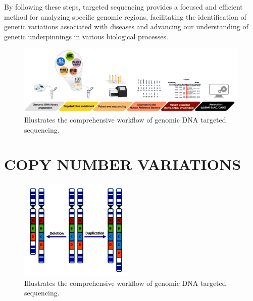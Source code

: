 \documentclass[a4paper,12pt,twoside]{ThesisStyle}
\begin{document}
By following these steps, targeted sequencing provides a focused and efficient method for analyzing specific genomic regions, facilitating the identification of genetic variations associated with diseases and advancing our understanding of genetic underpinnings in various biological processes.
\begin{figure}[htb]
\centering
\includegraphics[width=15 cm]{imatges/DNA_sequencing.png}
\caption{\label{fig:logo} Illustrates the comprehensive workflow of genomic DNA targeted sequencing.}
\end{figure}

\section{COPY NUMBER VARIATIONS}

\begin{figure} %
    \centering
    \includegraphics[width=0.48\textwidth]{imatges/CNV.jpg} %
    \caption{\label{fig:CNV} Illustrates the comprehensive workflow of genomic DNA targeted sequencing.}
\end{figure}
\end{document}

